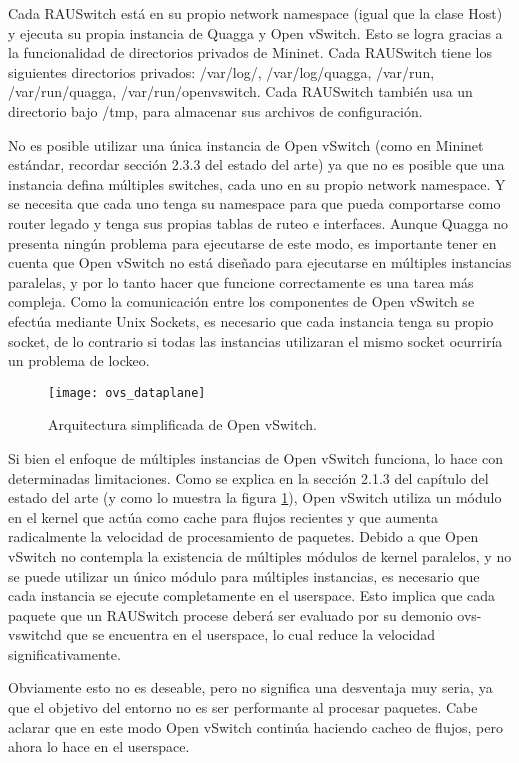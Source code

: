 Cada RAUSwitch está en su propio network namespace (igual que la clase Host) y ejecuta su propia instancia de Quagga y Open vSwitch. Esto se logra gracias a la funcionalidad de directorios privados de Mininet. Cada RAUSwitch tiene los siguientes directorios privados: /var/log/, /var/log/quagga, /var/run, /var/run/quagga, /var/run/openvswitch. Cada RAUSwitch también usa un directorio bajo /tmp, para almacenar sus archivos de configuración.

No es posible utilizar una única instancia de Open vSwitch (como en Mininet estándar, recordar sección 2.3.3 del estado del arte) ya que no es posible que una instancia defina múltiples switches, cada uno en su propio network namespace. Y se necesita que cada uno tenga su namespace para que pueda comportarse como router legado y tenga sus propias tablas de ruteo e interfaces. Aunque Quagga no presenta ningún problema para ejecutarse de este modo, es importante tener en cuenta que Open vSwitch no está diseñado para ejecutarse en múltiples instancias paralelas, y por lo tanto hacer que funcione correctamente es una tarea más compleja. Como la comunicación entre los componentes de Open vSwitch se efectúa mediante Unix Sockets, es necesario que cada instancia tenga su propio socket, de lo contrario si todas las instancias utilizaran el mismo socket ocurriría un problema de lockeo.

\begin{figure}[t]
	\caption{Arquitectura simplificada de Open vSwitch.}
	\texttt{[image: ovs\_dataplane]}
	\centering
	\label{fig:ovs_dataplane}
\end{figure}

Si bien el enfoque de múltiples instancias de Open vSwitch funciona, lo hace con determinadas limitaciones. Como se explica en la sección 2.1.3 del capítulo del estado del arte (y como lo muestra la figura \ref{fig:ovs_dataplane}), Open vSwitch utiliza un módulo en el kernel que actúa como cache para flujos recientes y que aumenta radicalmente la velocidad de procesamiento de paquetes. Debido a que Open vSwitch no contempla la existencia de múltiples módulos de kernel paralelos, y no se puede utilizar un único módulo para múltiples instancias, es necesario que cada instancia se ejecute completamente en el userspace. Esto implica que cada paquete que un RAUSwitch procese deberá ser evaluado por su demonio ovs-vswitchd que se encuentra en el userspace, lo cual reduce la velocidad significativamente.

Obviamente esto no es deseable, pero no significa una desventaja muy seria, ya que el objetivo del entorno no es ser performante al procesar paquetes. Cabe aclarar que en este modo Open vSwitch continúa haciendo cacheo de flujos, pero ahora lo hace en el userspace.

